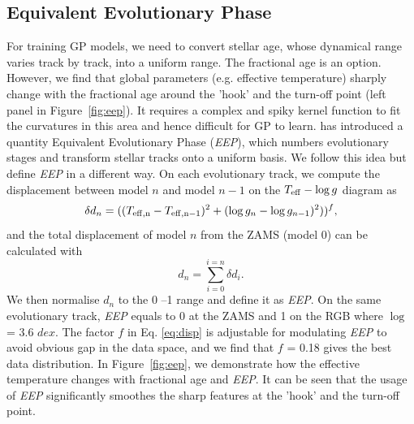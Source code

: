 
\subsection{Equivalent Evolutionary Phase}

For training GP models, we need to convert stellar age, whose dynamical range varies track by track, into a uniform range. The fractional age is an option. However, we find that global parameters (e.g. effective temperature) sharply change with the fractional age around the 'hook' and the turn-off point (left panel in Figure~\ref{fig:eep}). It requires a complex and spiky kernel function to fit the curvatures in this area and hence difficult for GP to learn. \citet{2016ApJS..222....8D} has introduced a quantity Equivalent Evolutionary Phase ({\it EEP}), which numbers evolutionary stages and transform stellar tracks onto a uniform basis. We follow this idea but define {\it EEP} in a different way.
%
On each evolutionary track, we compute the displacement between model $n$ and model $n-1$ on the $T_{\rm eff} - \log g$ diagram as
\begin{equation}\label{eq:disp}
\delta d_{n} = ((T_{\rm eff, n} - T_{\rm eff, n-1}) ^{2} + (\log g _{n} - \log g_{n-1})^{2}))^{f},
\end{equation}
and the total displacement of model $n$ from the ZAMS (model 0) can be calculated with
\begin{equation}
d_{n} = \sum_{i = 0}^{i = n} \delta d_{i} .
\end{equation}
We then normalise $d_{n}$ to the 0 --1 range and define it as {\it EEP}. On the same evolutionary track, {\it EEP} equals to 0 at the ZAMS and 1 on the RGB where $\log$ = 3.6 $dex$. The factor $f$ in Eq. \ref{eq:disp} is adjustable for modulating {\it EEP} to avoid obvious gap in the data space, and we find that $f$ = 0.18 gives the best data distribution.
%
In Figure~\ref{fig:eep}, we demonstrate how the effective temperature changes with fractional age and {\it EEP}. It can be seen that the usage of {\it EEP} significantly smoothes the sharp features at the 'hook' and the turn-off point.

